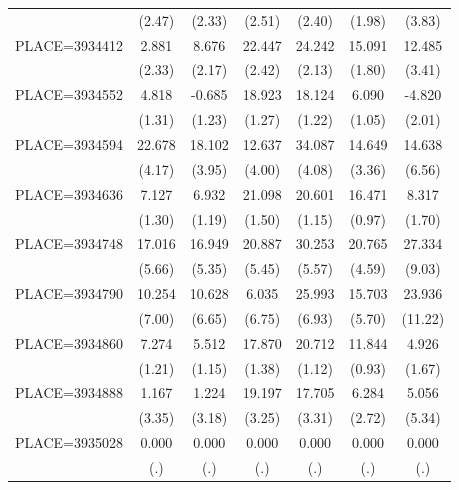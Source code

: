 {\begin{tabular}{l*{6}{c}}
                    &      (2.47)&      (2.33)&      (2.51)&      (2.40)&      (1.98)&      (3.83)\\
PLACE=3934412       &       2.881&       8.676&      22.447&      24.242&      15.091&      12.485\\
                    &      (2.33)&      (2.17)&      (2.42)&      (2.13)&      (1.80)&      (3.41)\\
PLACE=3934552       &       4.818&      -0.685&      18.923&      18.124&       6.090&      -4.820\\
                    &      (1.31)&      (1.23)&      (1.27)&      (1.22)&      (1.05)&      (2.01)\\
PLACE=3934594       &      22.678&      18.102&      12.637&      34.087&      14.649&      14.638\\
                    &      (4.17)&      (3.95)&      (4.00)&      (4.08)&      (3.36)&      (6.56)\\
PLACE=3934636       &       7.127&       6.932&      21.098&      20.601&      16.471&       8.317\\
                    &      (1.30)&      (1.19)&      (1.50)&      (1.15)&      (0.97)&      (1.70)\\
PLACE=3934748       &      17.016&      16.949&      20.887&      30.253&      20.765&      27.334\\
                    &      (5.66)&      (5.35)&      (5.45)&      (5.57)&      (4.59)&      (9.03)\\
PLACE=3934790       &      10.254&      10.628&       6.035&      25.993&      15.703&      23.936\\
                    &      (7.00)&      (6.65)&      (6.75)&      (6.93)&      (5.70)&     (11.22)\\
PLACE=3934860       &       7.274&       5.512&      17.870&      20.712&      11.844&       4.926\\
                    &      (1.21)&      (1.15)&      (1.38)&      (1.12)&      (0.93)&      (1.67)\\
PLACE=3934888       &       1.167&       1.224&      19.197&      17.705&       6.284&       5.056\\
                    &      (3.35)&      (3.18)&      (3.25)&      (3.31)&      (2.72)&      (5.34)\\
PLACE=3935028       &       0.000&       0.000&       0.000&       0.000&       0.000&       0.000\\
                    &         (.)&         (.)&         (.)&         (.)&         (.)&         (.)\\

\end{tabular}}
